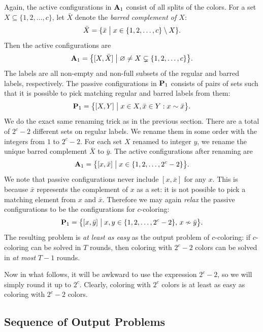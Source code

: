 Again, the active configurations in $\mathbf{A}_1$ consist of all splits of the colors. For a set $X \subseteq \{1,2,\dots,c\}$, let $\bar{X}$ denote the \emph{barred complement of $X$}:
\[
	\bar{X} = \{ \bar{x} \bigm| x \in \{ 1,2,\dots,c\} \setminus X \}.
\]
Then the active configurations are 
\[
	\mathbf{A}_1 = \bigl\{ [X, \bar{X}] \bigm| \varnothing \ne X \subsetneq \{1,2,\dots,c\} \bigr\}.
\]
The labels are all non-empty and non-full subsets of the regular and barred labels, respectively. The passive configurations in $\mathbf{P}_1$ consists of pairs of sets such that it is possible to pick matching regular and barred labels from them:
\[
	\mathbf{P}_1 = \bigl\{ [X,Y] \bigm| x \in X, \bar{x} \in Y: x \sim \bar{x} \bigr\}.
\]
We do the exact same renaming trick as in the previous section. There are a total of $2^c - 2$ different sets on regular labels. We rename them in some order with the integers from $1$ to $2^c-2$. For each set $X$ renamed to integer $y$, we rename the unique barred complement $\bar{X}$ to $\bar{y}$. The active configurations after renaming are
\[
	\mathbf{A}_1 = \bigl\{ [x,\bar{x}] \bigm| x \in \{1,2,\dots, 2^c-2 \} \bigr\}.
\]
We note that passive configurations never include $[x,\bar{x}]$ for any $x$. This is because $\bar{x}$ represents the complement of $x$ as a set: it is not possible to pick a matching element from $x$ and $\bar{x}$. Therefore we may again \emph{relax} the passive configurations to be the configurations for $c$-coloring:
\[
	\collP_1 = \bigl\{ [x,\bar y] \bigm| x, y \in \{1,2,\dots,2^c-2\},\, x \nsim \bar y \bigr\}.
\]
The resulting problem is \emph{at least as easy} as the output problem of $c$-coloring: if $c$-coloring can be solved in $T$ rounds, then coloring with $2^c-2$ colors can be solved in \emph{at most} $T-1$ rounds.

Now in what follows, it will be awkward to use the expression $2^c-2$, so we will simply round it up to $2^c$. Clearly, coloring with $2^c$ colors is at least as easy as coloring with $2^c-2$ colors.

\subsection{Sequence of Output Problems}

